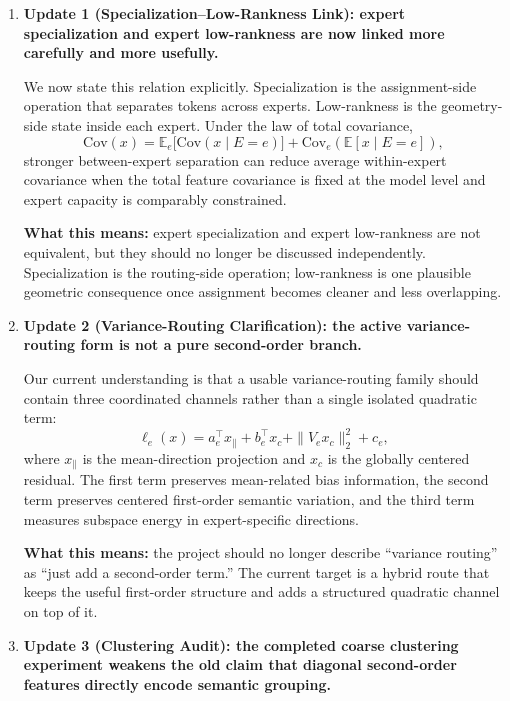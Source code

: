 \documentclass[11pt]{article}
\begin{document}
\begin{enumerate}
    \item \textbf{Update 1 (Specialization--Low-Rankness Link): expert specialization and expert low-rankness are now linked more carefully and more usefully.}

    We now state this relation explicitly. Specialization is the assignment-side operation that separates tokens across experts. Low-rankness is the geometry-side state inside each expert. Under the law of total covariance,
    \[
    \mathrm{Cov}(x)
    =
    \mathbb{E}_{e}\!\big[\mathrm{Cov}(x\mid E=e)\big]
    +
    \mathrm{Cov}_{e}(\mathbb{E}[x\mid E=e]),
    \]
    stronger between-expert separation can reduce average within-expert covariance when the total feature covariance is fixed at the model level and expert capacity is comparably constrained.

    \textbf{What this means:} expert specialization and expert low-rankness are not equivalent, but they should no longer be discussed independently. Specialization is the routing-side operation; low-rankness is one plausible geometric consequence once assignment becomes cleaner and less overlapping.

    \item \textbf{Update 2 (Variance-Routing Clarification): the active variance-routing form is not a pure second-order branch.}

    Our current understanding is that a usable variance-routing family should contain three coordinated channels rather than a single isolated quadratic term:
    \[
    \ell_e(x)
    =
    a_e^\top x_{\parallel}
    +
    b_e^\top x_c
    +
    \|V_e x_c\|_2^2
    +
    c_e,
    \]
    where $x_{\parallel}$ is the mean-direction projection and $x_c$ is the globally centered residual. The first term preserves mean-related bias information, the second term preserves centered first-order semantic variation, and the third term measures subspace energy in expert-specific directions.

    \textbf{What this means:} the project should no longer describe ``variance routing'' as ``just add a second-order term.'' The current target is a hybrid route that keeps the useful first-order structure and adds a structured quadratic channel on top of it.

    \item \textbf{Update 3 (Clustering Audit): the completed coarse clustering experiment weakens the old claim that diagonal second-order features directly encode semantic grouping.}


\end{enumerate}
\end{document}
